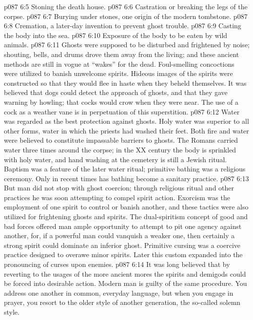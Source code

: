 \vs p087 6:5 \bibnobreakspace Stoning the death house.
\vs p087 6:6 \bibnobreakspace Castration or breaking the legs of the corpse.
\vs p087 6:7 \bibnobreakspace Burying under stones, one origin of the modern tombstone.
\vs p087 6:8 \bibnobreakspace Cremation, a later\hyp{}day invention to prevent ghost trouble.
\vs p087 6:9 \bibnobreakspace Casting the body into the sea.
\vs p087 6:10 \bibnobreakspace Exposure of the body to be eaten by wild animals.
\vs p087 6:11 \pc Ghosts were supposed to be disturbed and frightened by noise; shouting, bells, and drums drove them away from the living; and these ancient methods are still in vogue at “wakes” for the dead. Foul\hyp{}smelling concoctions were utilized to banish unwelcome spirits. Hideous images of the spirits were constructed so that they would flee in haste when they beheld themselves. It was believed that dogs could detect the approach of ghosts, and that they gave warning by howling; that cocks would crow when they were near. The use of a cock as a weather vane is in perpetuation of this superstition.
\vs p087 6:12 Water was regarded as the best protection against ghosts. Holy water was superior to all other forms, water in which the priests had washed their feet. Both fire and water were believed to constitute impassable barriers to ghosts. The Romans carried water three times around the corpse; in the XX century the body is sprinkled with holy water, and hand washing at the cemetery is still a Jewish ritual. Baptism was a feature of the later water ritual; primitive bathing was a religious ceremony. Only in recent times has bathing become a sanitary practice.
\vs p087 6:13 But man did not stop with ghost coercion; through religious ritual and other practices he was soon attempting to compel spirit action. Exorcism was the employment of one spirit to control or banish another, and these tactics were also utilized for frightening ghosts and spirits. The dual\hyp{}spiritism concept of good and bad forces offered man ample opportunity to attempt to pit one agency against another, for, if a powerful man could vanquish a weaker one, then certainly a strong spirit could dominate an inferior ghost. Primitive cursing was a coercive practice designed to overawe minor spirits. Later this custom expanded into the pronouncing of curses upon enemies.
\vs p087 6:14 It was long believed that by reverting to the usages of the more ancient mores the spirits and demigods could be forced into desirable action. Modern man is guilty of the same procedure. You address one another in common, everyday language, but when you engage in prayer, you resort to the older style of another generation, the so\hyp{}called solemn style.
